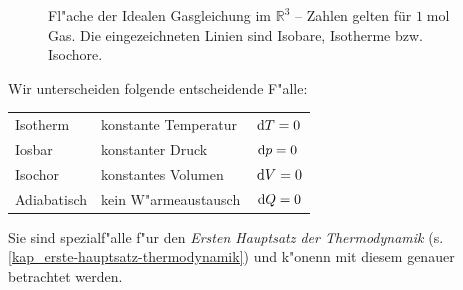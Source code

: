 \begin{figure}
   \centering 
{}  
\caption[Flächen der Idealen Gasgleichung]{Fl"ache der Idealen
     Gasgleichung im $\mathbb R^3$ -- Zahlen gelten für $1
     \operatorname{mol}$ Gas. Die eingezeichneten Linien sind Isobare,
     Isotherme bzw. Isochore.}
   \label{abb_ideale-gasgleichung}
\end{figure}

Wir unterscheiden folgende entscheidende F"alle:
\begin{center}
   \begin{tabular}[c]{l l l}
   Isotherm & konstante Temperatur & $\, \mathrm{d} T = 0$\\
   Iosbar & konstanter Druck & $\, \mathrm{d} p = 0$\\
   Isochor & konstantes Volumen & $\, \mathrm{d} V = 0$\\
   Adiabatisch & kein W"armeaustausch & $\, \mathrm{d} Q = 0$
\end{tabular}
\end{center}
 Sie sind spezialf"alle
f"ur den \emph{Ersten Hauptsatz der Thermodynamik} (s.
\ref{kap_erste-hauptsatz-thermodynamik}) und k"onenn mit
diesem genauer betrachtet werden. 

